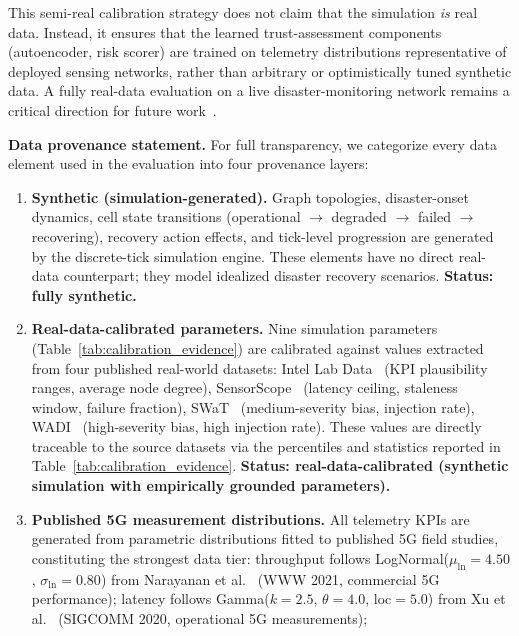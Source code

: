 \documentclass[10pt,journal,compsoc]{IEEEtran}
\begin{document}
\noindent This semi-real calibration strategy does not claim that the simulation \emph{is} real data.
Instead, it ensures that the learned trust-assessment components (autoencoder, risk scorer) are trained on telemetry distributions representative of deployed sensing networks, rather than arbitrary or optimistically tuned synthetic data.
A fully real-data evaluation on a live disaster-monitoring network remains a critical direction for future work~\cite{cardenas2011attacks}.

\noindent\textbf{Data provenance statement.}
\label{sec:data_provenance}
For full transparency, we categorize every data element used in the evaluation into four provenance layers:
\begin{enumerate}
    \item \textbf{Synthetic (simulation-generated).}
    Graph topologies, disaster-onset dynamics, cell state transitions (operational $\to$ degraded $\to$ failed $\to$ recovering), recovery action effects, and tick-level progression are generated by the discrete-tick simulation engine.
    These elements have no direct real-data counterpart; they model idealized disaster recovery scenarios.
    \textbf{Status: fully synthetic.}
    \item \textbf{Real-data-calibrated parameters.}
    Nine simulation parameters (Table~\ref{tab:calibration_evidence}) are calibrated against values extracted from four published real-world datasets:
    Intel Lab Data~\cite{intel_lab_data_2004} (KPI plausibility ranges, average node degree),
    SensorScope~\cite{sensorscope2008} (latency ceiling, staleness window, failure fraction),
    SWaT~\cite{goh2017swat} (medium-severity bias, injection rate),
    WADI~\cite{wadi2018} (high-severity bias, high injection rate).
    These values are directly traceable to the source datasets via the percentiles and statistics reported in Table~\ref{tab:calibration_evidence}.
    \textbf{Status: real-data-calibrated (synthetic simulation with empirically grounded parameters).}
    \item \textbf{Published 5G measurement distributions.}
    All telemetry KPIs are generated from parametric distributions fitted to published 5G field studies, constituting the strongest data tier:
    throughput follows LogNormal($\mu_{\ln}=4.50$, $\sigma_{\ln}=0.80$) from Narayanan et al.~\cite{narayanan2021first} (WWW 2021, commercial 5G performance);
    latency follows Gamma($k=2.5$, $\theta=4.0$, loc$=5.0$) from Xu et al.~\cite{xu2020understanding} (SIGCOMM 2020, operational 5G measurements);

\end{enumerate}
\end{document}
